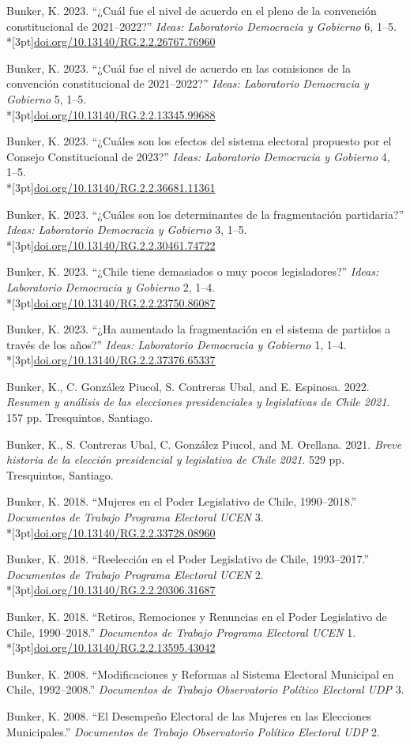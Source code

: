 \documentclass[11pt,letterpaper]{article}
\newif\ifafterhead
\newlength{\entrygap}\setlength{\entrygap}{8.5pt}
\newcommand{\gap}{\ifafterhead\global\afterheadfalse\else\vspace{\entrygap}\fi}
\newcommand{\entry}[1]{\par\gap\hangindent=13pt\hangafter=1\noindent #1\par}
\newcommand{\doi}[1]{\\*[3pt]{\small\href{https://doi.org/#1}{doi.org/#1}}}
\newcommand{\ideas}{\textit{Ideas: Laboratorio Democracia y Gobierno}}
\begin{document}
\entry{Bunker, K. 2023. ``¿Cuál fue el nivel de acuerdo en el pleno de la convención constitucional de 2021--2022?'' \ideas{} 6, 1--5.\doi{10.13140/RG.2.2.26767.76960}}

\entry{Bunker, K. 2023. ``¿Cuál fue el nivel de acuerdo en las comisiones de la convención constitucional de 2021--2022?'' \ideas{} 5, 1--5.\doi{10.13140/RG.2.2.13345.99688}}

\entry{Bunker, K. 2023. ``¿Cuáles son los efectos del sistema electoral propuesto por el Consejo Constitucional de 2023?'' \ideas{} 4, 1--5.\doi{10.13140/RG.2.2.36681.11361}}

\entry{Bunker, K. 2023. ``¿Cuáles son los determinantes de la fragmentación partidaria?'' \ideas{} 3, 1--5.\doi{10.13140/RG.2.2.30461.74722}}

\entry{Bunker, K. 2023. ``¿Chile tiene demasiados o muy pocos legisladores?'' \ideas{} 2, 1--4.\doi{10.13140/RG.2.2.23750.86087}}

\entry{Bunker, K. 2023. ``¿Ha aumentado la fragmentación en el sistema de partidos a través de los años?'' \ideas{} 1, 1--4.\doi{10.13140/RG.2.2.37376.65337}}

\entry{Bunker, K., C. González Piucol, S. Contreras Ubal, and E. Espinosa. 2022. \textit{Resumen y análisis de las elecciones presidenciales y legislativas de Chile 2021}. 157 pp. Tresquintos, Santiago.}

\entry{Bunker, K., S. Contreras Ubal, C. González Piucol, and M. Orellana. 2021. \textit{Breve historia de la elección presidencial y legislativa de Chile 2021}. 529 pp. Tresquintos, Santiago.}

\entry{Bunker, K. 2018. ``Mujeres en el Poder Legislativo de Chile, 1990--2018.'' \textit{Documentos de Trabajo Programa Electoral UCEN} 3.\doi{10.13140/RG.2.2.33728.08960}}

\entry{Bunker, K. 2018. ``Reelección en el Poder Legislativo de Chile, 1993--2017.'' \textit{Documentos de Trabajo Programa Electoral UCEN} 2.\doi{10.13140/RG.2.2.20306.31687}}

\entry{Bunker, K. 2018. ``Retiros, Remociones y Renuncias en el Poder Legislativo de Chile, 1990--2018.'' \textit{Documentos de Trabajo Programa Electoral UCEN} 1.\doi{10.13140/RG.2.2.13595.43042}}

\entry{Bunker, K. 2008. ``Modificaciones y Reformas al Sistema Electoral Municipal en Chile, 1992--2008.'' \textit{Documentos de Trabajo Observatorio Político Electoral UDP} 3.}

\entry{Bunker, K. 2008. ``El Desempeño Electoral de las Mujeres en las Elecciones Municipales.'' \textit{Documentos de Trabajo Observatorio Político Electoral UDP} 2.}
\end{document}
